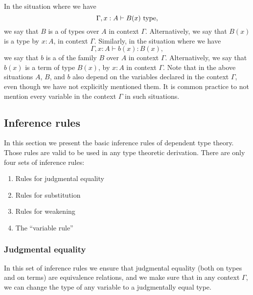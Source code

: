 In the situation where we have
\begin{equation*}
  \Gamma,x:A\vdash B(x)~\mathrm{type},
\end{equation*}
we say that $B$ is a  of types over $A$ in context $\Gamma$. Alternatively, we say that $B(x)$ is a type  by $x:A$, in context $\Gamma$. Similarly, in the situation where we have
\begin{equation*}
  \Gamma,x:A\vdash b(x):B(x),
\end{equation*}
we say that $b$ is a  of the family $B$ over $A$ in context $\Gamma$. Alternatively, we say that $b(x)$ is a term of type $B(x)$,  by $x:A$ in context $\Gamma$. Note that in the above situations $A$, $B$, and $b$ also depend on the variables declared in the context $\Gamma$, even though we have not explicitly mentioned them. It is common practice to not mention every variable in the context $\Gamma$ in such situations.


\subsection{Inference rules}\label{sec:rules}

In this section we present the basic inference rules of dependent type theory. Those rules are valid to be used in any type theoretic derivation. There are only four sets of inference rules:
\begin{enumerate}
\item Rules for judgmental equality 
\item Rules for substitution
\item Rules for weakening
\item The ``variable rule''
\end{enumerate}

\subsubsection*{Judgmental equality}

In this set of inference rules we ensure that judgmental equality (both on types and on terms) are equivalence relations, and we make sure that in any context $\Gamma$, we can change the type of any variable to a judgmentally equal type.

